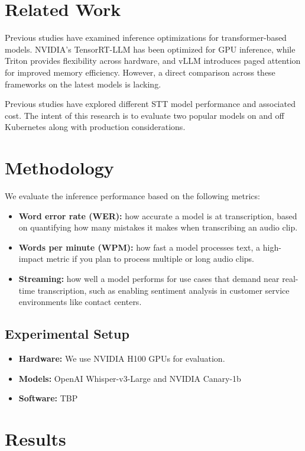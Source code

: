 \documentclass[11pt, oneside]{article}   	%
\begin{document}
\section{Related Work}
Previous studies have examined inference optimizations for transformer-based models. NVIDIA's TensorRT-LLM has been optimized for GPU inference, while Triton provides flexibility across hardware, and vLLM introduces paged attention for improved memory efficiency. However, a direct comparison across these frameworks on the latest models is lacking.

Previous studies have explored different STT model performance and associated cost. The intent of this research is to evaluate two popular models on and off Kubernetes along with production considerations.

\section{Methodology}
We evaluate the inference performance based on the following metrics:
\begin{itemize}
    \item \textbf{Word error rate (WER):} how accurate a model is at transcription, based on quantifying how many mistakes it makes when transcribing an audio clip.
    \item \textbf{Words per minute (WPM):} how fast a model processes text, a high-impact metric if you plan to process multiple or long audio clips.
    \item \textbf{Streaming:} how well a model performs for use cases that demand near real-time transcription, such as enabling sentiment analysis in customer service environments like contact centers.
\end{itemize}

\subsection{Experimental Setup}
\begin{itemize}
    \item \textbf{Hardware:} We use NVIDIA H100 GPUs for evaluation.
    \item \textbf{Models:} OpenAI Whisper-v3-Large and NVIDIA Canary-1b
    \item \textbf{Software:} TBP
\end{itemize}

\section{Results}
\end{document}
